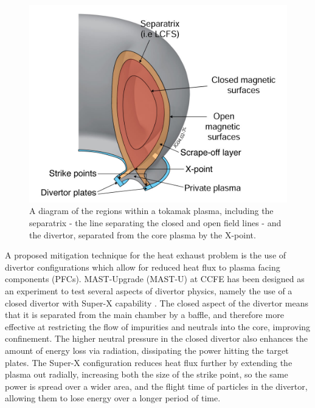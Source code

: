 \documentclass[a4paper, 11pt]{article} %
\begin{document}
	\begin{figure}
		\centering
		\vspace{-10pt}
		\includegraphics[width=1.0\linewidth]{IllustrativeFigures/divertor.jpg}
		\caption{\label{fig:divertor}A diagram of the regions within a tokamak plasma, including the separatrix - the line separating the closed and open field lines - and the divertor, separated from the core plasma by the X-point.}
	\end{figure}
	A proposed mitigation technique for the heat exhaust problem is the use of divertor configurations which allow for reduced heat flux to plasma facing components (PFCs). 
	MAST-Upgrade (MAST-U) at CCFE has been designed as an experiment to test several aspects of divertor physics, namely the use of a closed divertor with Super-X capability \cite{Valanju2009}.
	The closed aspect of the divertor means that it is separated from the main chamber by a baffle, and therefore more effective at restricting the flow of impurities and neutrals into the core, improving confinement. 
	The higher neutral pressure in the closed divertor also enhances the amount of energy loss via radiation, dissipating the power hitting the target plates.
	The Super-X configuration reduces heat flux further by extending the plasma out radially, increasing both the size of the strike point, so the same power is spread over a wider area, and the flight time of particles in the divertor, allowing them to lose energy over a longer period of time.
\end{document}

